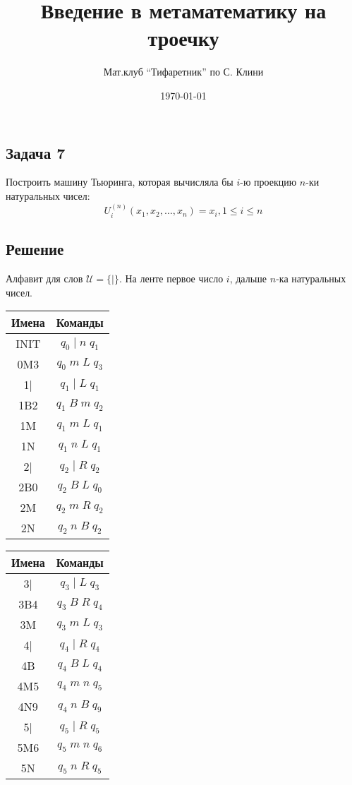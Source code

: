\documentclass[a4paper, 12pt]{article}  %
\author{Мат.клуб ``Тифаретник'' по С. Клини}
\title{Введение в метаматематику на троечку}
\date{\today}
\theoremstyle{definition}
\begin{document}
	
	\subsection*{Задача 7}
	
	Построить машину Тьюринга, которая вычисляла бы $i$-ю проекцию $n$-ки натуральных чисел:
	$$U^{(n)}_i (x_1, x_2, \dots, x_n) = x_i, 1 \le i \le n$$
	
	\subsection*{Решение}
	
	Алфавит для слов $\mathscr{U} = \{|\}$. На ленте первое число $i$, дальше $n$-ка натуральных чисел. 
	
		\begin{multicols}{4}
		\begin{tabular}{ | c | c |  }
			\hline
			Имена & Команды \\ 
			\hline
			INIT & $q_0 \; | \; n \; q_1$ \\
			0M3 & $q_0 \; m \; L \; q_3$ \\
			\hline
			1| & $q_1 \; | \; L \; q_1$ \\
			1B2 & $q_1 \; B \; m \; q_2$ \\
			1M & $q_1 \; m \; L \; q_1$ \\
			1N & $q_1 \; n \; L \; q_1$ \\
			\hline
			2| & $q_2 \; | \; R \; q_2$ \\
			2B0 & $q_2 \; B \; L \; q_0$ \\
			2M & $q_2 \; m \; R \; q_2$ \\
			2N & $q_2 \; n \; B \; q_2$ \\
			\hline
		\end{tabular}
		
		\begin{tabular}{ | c | c |  }
			\hline
			Имена & Команды \\ 
			\hline
			3| & $q_3 \; | \; L \; q_3$ \\
			3B4 & $q_3 \; B \; R \; q_4$ \\
			3M & $q_3 \; m \; L \; q_3$ \\
			\hline
			4| & $q_4 \; | \; R \; q_4$ \\
			4B & $q_4 \; B \; L \; q_4$ \\
			4M5 & $q_4 \; m \; n \; q_5$ \\
			4N9 & $q_4 \; n \; B \; q_9$ \\
			\hline
			5| & $q_5 \; | \; R \; q_5$ \\
			5M6 & $q_5 \; m \; n \; q_6$ \\
			5N & $q_5 \; n \; R \; q_5$ \\
			\hline
		\end{tabular}
		

\end{multicols}
\end{document}
